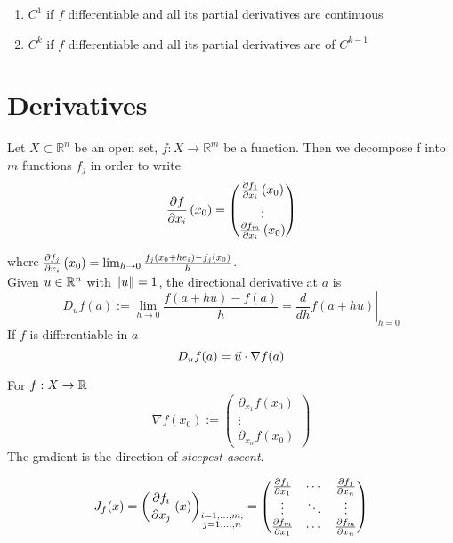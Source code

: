 \Def[$C^k$]
\begin{enumerate}
	\item $C^1$ if $f$ differentiable and all its partial derivatives are continuous
	\item $C^k$ if $f$ differentiable and all its partial derivatives are of $C^{k-1}$
\end{enumerate}

\section{Derivatives}

 Let $X\subset\mathbb{R}^n$ be an open set, $f\colon X \to \mathbb{R}^m$ be a function. Then we decompose f into $m$ functions $f_j$ in order to write
$$\frac{\partial f}{\partial x_i}\left(x_{0}\right) = \begin{pmatrix}
								   \frac{\partial f_1}{\partial x_i}\left(x_{0}\right)
								   \\ \vdots \\
								   \frac{\partial f_m}{\partial x_i}\left(x_{0}\right)
								   \end{pmatrix}$$

where $\frac{\partial f_j}{\partial x_i}\left(x_{0}\right) = \lim_{h \rightarrow 0} \frac{f_j(x_0+h e_i)-f_j(x_0)}{h}$. \\

 Given $u \in \mathbb{R}^n$ with $\left\lVert u \right\rVert=1$, the directional derivative at $a$ is
$$D_uf(a) := \lim_{h\to0}\frac{f(a + hu) -f(a)}{h} =
		\left.\frac{d}{dh}f(a+hu)\right|_{h = 0}$$
If $f$ is differentiable in $a$
$$ D_u f(a) = \vec{u} \cdot \nabla f(a)$$

\Def[Gradient] For $f : X \rightarrow \mathbb{R}$
$$ \nabla f (x_0) := \begin{pmatrix}\partial_{x_1}f(x_0)\\\vdots\\\partial_{x_n}f(x_0)\end{pmatrix}$$
The gradient is the direction of \textit{steepest ascent}.

$$
J_f(x) = \left(\frac{\partial f_i}{\partial x_j}\left(x\right)\right)_{\substack{ i= 1,\dots,m;\\ j=1,\dots,n}} = 
    \begin{pmatrix}{\frac {\partial f_{1}}{\partial x_{1}}}&\cdots &{\frac {\partial f_{1}}{\partial x_{n}}}\\\vdots &\ddots &\vdots \\{\frac {\partial f_{m}}{\partial x_{1}}}&\cdots &{\frac {\partial f_{m}}{\partial x_{n}}}\end{pmatrix}
$$

